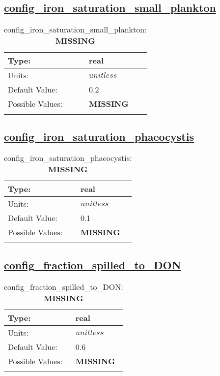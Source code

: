 \subsection[config\_iron\_saturation\_small\_plankton]{\hyperref[sec:nm_tab_biogeochemistry]{config\_iron\_saturation\_small\_plankton}}
\label{subsec:nm_sec_config_iron_saturation_small_plankton}
\begin{center}
\begin{longtable}{| p{2.0in} || p{4.0in} |}
    \hline
    Type: & real \\
    \hline
    Units: & $unitless$ \\
    \hline
    Default Value: & 0.2 \\
    \hline
    Possible Values: & {\bf \color{red} MISSING} \\
    \hline
    \caption{config\_iron\_saturation\_small\_plankton: {\bf \color{red} MISSING}}
\end{longtable}
\end{center}
\subsection[config\_iron\_saturation\_phaeocystis]{\hyperref[sec:nm_tab_biogeochemistry]{config\_iron\_saturation\_phaeocystis}}
\label{subsec:nm_sec_config_iron_saturation_phaeocystis}
\begin{center}
\begin{longtable}{| p{2.0in} || p{4.0in} |}
    \hline
    Type: & real \\
    \hline
    Units: & $unitless$ \\
    \hline
    Default Value: & 0.1 \\
    \hline
    Possible Values: & {\bf \color{red} MISSING} \\
    \hline
    \caption{config\_iron\_saturation\_phaeocystis: {\bf \color{red} MISSING}}
\end{longtable}
\end{center}
\subsection[config\_fraction\_spilled\_to\_DON]{\hyperref[sec:nm_tab_biogeochemistry]{config\_fraction\_spilled\_to\_DON}}
\label{subsec:nm_sec_config_fraction_spilled_to_DON}
\begin{center}
\begin{longtable}{| p{2.0in} || p{4.0in} |}
    \hline
    Type: & real \\
    \hline
    Units: & $unitless$ \\
    \hline
    Default Value: & 0.6 \\
    \hline
    Possible Values: & {\bf \color{red} MISSING} \\
    \hline
    \caption{config\_fraction\_spilled\_to\_DON: {\bf \color{red} MISSING}}
\end{longtable}
\end{center}
